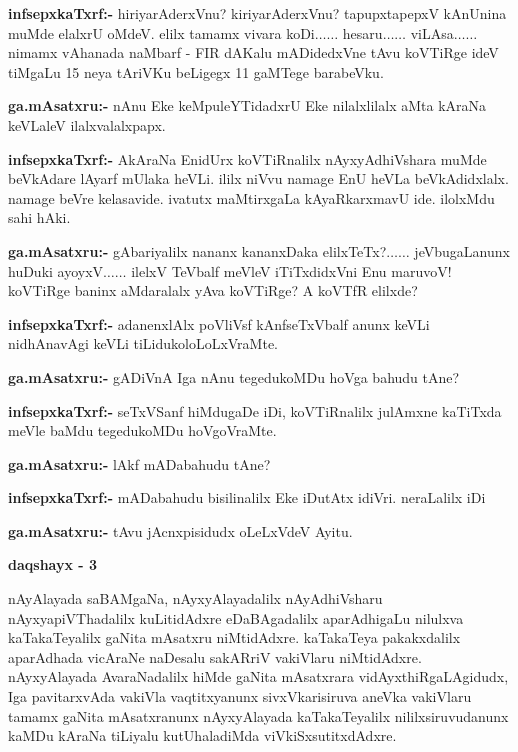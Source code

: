 \smallskip
\noindent
\textbf{infsepxkaTxrf:-} hiriyarAderxVnu? kiriyarAderxVnu? tapupxtapepxV kAnUnina muMde elalxrU oMdeV. elilx tamamx vivara koDi$\ldots\ldots$ hesaru$\ldots\ldots$ viLAsa$\ldots\ldots$ nimamx vAhanada naMbarf - {\rm FIR} dAKalu mADidedxVne tAvu koVTiRge ideV tiMgaLu {\rm 15} neya tAriVKu beLigegx {\rm 11} gaMTege barabeVku.

\smallskip
\noindent
\textbf{ga.mAsatxru:-} nAnu Eke keMpuleYTidadxrU Eke nilalxlilalx aMta kAraNa keVLaleV ilalxvalalxpapx.

\smallskip
\noindent
\textbf{infsepxkaTxrf:-} AkAraNa EnidUrx koVTiRnalilx nAyxyAdhiVshara muMde beVkAdare lAyarf mUlaka heVLi. ililx niVvu namage EnU heVLa beVkAdidxlalx. namage beVre kelasavide. ivatutx maMtirxgaLa kAyaRkarxmavU ide. ilolxMdu sahi hAki.

\smallskip
\noindent
\textbf{ga.mAsatxru:-} gAbariyalilx nananx kananxDaka elilxTeTx?$\ldots\ldots$ jeVbugaLanunx huDuki ayoyxV$\ldots\ldots$ ilelxV TeVbalf meVleV iTiTxdidxVni Enu maruvoV! koVTiRge baninx aMdaralalx yAva koVTiRge? A koVTfR elilxde?

\smallskip
\noindent
\textbf{infsepxkaTxrf:-} adanenxlAlx poVliVsf kAnfseTxVbalf anunx keVLi nidhAnavAgi keVLi tiLidukoloLoLxVraMte.

\smallskip
\noindent
\textbf{ga.mAsatxru:-} gADiVnA Iga nAnu tegedukoMDu hoVga bahudu tAne?

\smallskip
\noindent
\textbf{infsepxkaTxrf:-} seTxVSanf hiMdugaDe iDi, koVTiRnalilx julAmxne kaTiTxda meVle baMdu tegedukoMDu hoVgoVraMte.

\smallskip
\noindent
\textbf{ga.mAsatxru:-} lAkf mADabahudu tAne?

\smallskip
\noindent
\textbf{infsepxkaTxrf:-} mADabahudu bisilinalilx Eke iDutAtx idiVri. neraLalilx iDi 

\smallskip
\noindent
\textbf{ga.mAsatxru:-} tAvu jAcnxpisidudx oLeLxVdeV Ayitu.

\begin{center}
{\bf  daqshayx - {\rm 3}}
\end{center}

nAyAlayada saBAMgaNa, nAyxyAlayadalilx nAyAdhiVsharu nAyxyapiVThadalilx kuLitidAdxre eDaBAgadalilx aparAdhigaLu nilulxva kaTakaTeyalilx gaNita mAsatxru niMtidAdxre. kaTakaTeya pakakxdalilx aparAdhada vicAraNe naDesalu sakARriV vakiVlaru niMtidAdxre. nAyxyAlayada AvaraNadalilx hiMde gaNita mAsatxrara vidAyxthiRgaLAgidudx, Iga pavitarxvAda vakiVla vaqtitxyanunx sivxVkarisiruva aneVka vakiVlaru tamamx gaNita mAsatxranunx nAyxyAlayada kaTakaTeyalilx nililxsiruvudanunx kaMDu kAraNa tiLiyalu kutUhaladiMda viVkiSxsutitxdAdxre.

